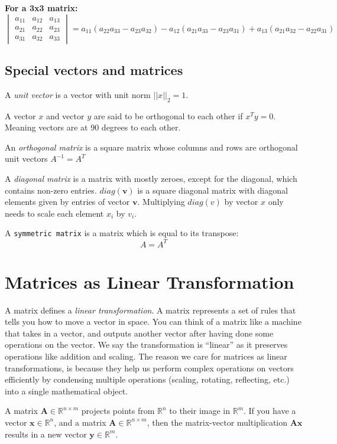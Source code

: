 \noindent
\textbf{For a 3x3 matrix:}
\[
	\begin{vmatrix}
		a_{11} & a_{12} & a_{13} \\
		a_{21} & a_{22} & a_{23} \\
		a_{31} & a_{32} & a_{33}
	\end{vmatrix}
	= a_{11}(a_{22}a_{33} - a_{23}a_{32}) - a_{12}(a_{21}a_{33} - a_{23}a_{31}) + a_{13}(a_{21}a_{32} - a_{22}a_{31})
\]

\subsection{Special vectors and matrices}%
\label{subsec:label}

A \textit{unit vector} is a vector with unit norm $||x||_{2}=1$.

A vector $x$ and vector $y$ are said to be orthogonal to each other if $x^{T}y=0$. Meaning vectors are at 90 degrees to each other.

An \textit{orthogonal matrix} is a square matrix whose columns and rows are orthogonal unit vectors $A^{-1} = A^{T}$

A \textit{diagonal matrix} is a matrix with mostly zeroes, except for the diagonal, which contains non-zero entries. $diag(\mathbf{v})$ is a square diagonal matrix with diagonal elements given by entries of vector $\mathbf{v}$. Multiplying $diag(v)$ by vector $x$ only needs to scale each element $x_{i}$ by $v_{i}$.

A \texttt{symmetric matrix} is a matrix which is equal to its transpose:
\[
	A = A^{T}
\]

\section{Matrices as Linear Transformation}%
\label{sec:label}

A matrix defines a \textit{linear transformation}. A matrix represents a set of rules that tells you how to move a vector in space. You can think of a matrix like a machine that takes in a vector, and outputs another vector after having done some operations on the vector. We say the transformation is ``linear'' as it preserves operations like addition and scaling. The reason we care for matrices as linear transformations, is because they help us perform complex operations on vectors efficiently by condensing multiple operations (scaling, rotating, reflecting, etc.) into a single mathematical object.

A matrix $\mathbf{A} \in \mathbb{R}^{n \times m}$ projects points from $\mathbb{R}^{n}$ to their image in $\mathbb{R}^{m}$. If you have a vector $\mathbf{x} \in \mathbb{R}^{n}$, and a matrix $\mathbf{A} \in \mathbb{R}^{n \times m}$, then the matrix-vector multiplication $\mathbf{Ax}$ results in a new vector $\mathbf{y} \in \mathbb{R}^{m}$.

